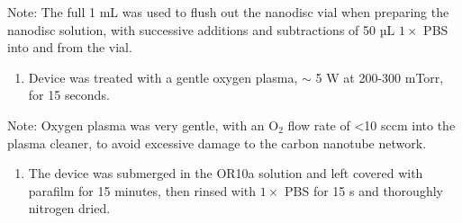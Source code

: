 \documentclass[
  a4paper,
]{scrbook}
\providecommand{\tightlist}{%
  \setlength{\itemsep}{0pt}\setlength{\parskip}{0pt}}\usepackage{longtable,booktabs,array}
\begin{document}
Note: The full 1 mL was used to flush out the nanodisc vial when
preparing the nanodisc solution, with successive additions and
subtractions of 50 µL \(1 \times\) PBS into and from the vial.

\begin{enumerate}
\def\labelenumi{\arabic{enumi}.}
\setcounter{enumi}{3}
\tightlist
\item
  Device was treated with a gentle oxygen plasma, \(\sim\) 5 W at
  200-300 mTorr, for 15 seconds.
\end{enumerate}

Note: Oxygen plasma was very gentle, with an O\(_2\) flow rate of
\textless10 sccm into the plasma cleaner, to avoid excessive damage to
the carbon nanotube network.

\begin{enumerate}
\def\labelenumi{\arabic{enumi}.}
\setcounter{enumi}{4}
\tightlist
\item
  The device was submerged in the OR10a solution and left covered with
  parafilm for 15 minutes, then rinsed with \(1 \times\) PBS for 15 s
  and thoroughly nitrogen dried.
\end{enumerate}
\end{document}
